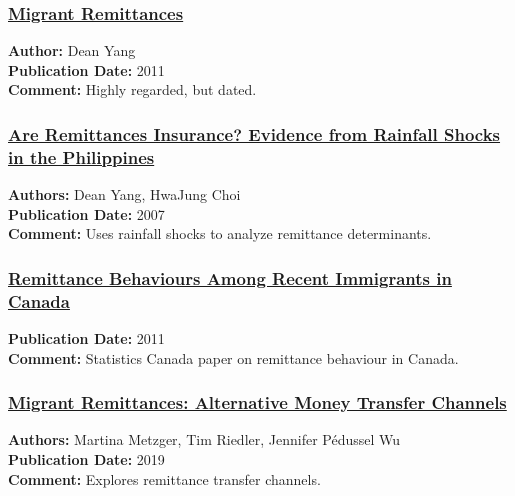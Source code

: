 \documentclass[
  11pt,
]{article}
\begin{document}
\subsubsection{\texorpdfstring{\href{https://drive.google.com/file/d/1e893ibGZcECt9gxIpPgq2XEE2kDGgqx-/view?usp=sharing}{Migrant
Remittances}}{Migrant Remittances}}\label{migrant-remittances}

\textbf{Author:} Dean Yang\\
\textbf{Publication Date:} 2011\\
\textbf{Comment:} Highly regarded, but dated.

\subsubsection{\texorpdfstring{\href{https://academic.oup.com/wber/article/21/2/219/1701529}{Are
Remittances Insurance? Evidence from Rainfall Shocks in the
Philippines}}{Are Remittances Insurance? Evidence from Rainfall Shocks in the Philippines}}\label{are-remittances-insurance-evidence-from-rainfall-shocks-in-the-philippines}

\textbf{Authors:} Dean Yang, HwaJung Choi\\
\textbf{Publication Date:} 2007\\
\textbf{Comment:} Uses rainfall shocks to analyze remittance
determinants.

\subsubsection{\texorpdfstring{\href{https://www.statcan.gc.ca/en/catalogue/11-008-X201100211619}{Remittance
Behaviours Among Recent Immigrants in
Canada}}{Remittance Behaviours Among Recent Immigrants in Canada}}\label{remittance-behaviours-among-recent-immigrants-in-canada}

\textbf{Publication Date:} 2011\\
\textbf{Comment:} Statistics Canada paper on remittance behaviour in
Canada.

\subsubsection{\texorpdfstring{\href{https://www.econstor.eu/handle/10419/204586}{Migrant
Remittances: Alternative Money Transfer
Channels}}{Migrant Remittances: Alternative Money Transfer Channels}}\label{migrant-remittances-alternative-money-transfer-channels}

\textbf{Authors:} Martina Metzger, Tim Riedler, Jennifer Pédussel Wu\\
\textbf{Publication Date:} 2019\\
\textbf{Comment:} Explores remittance transfer channels.
\end{document}
